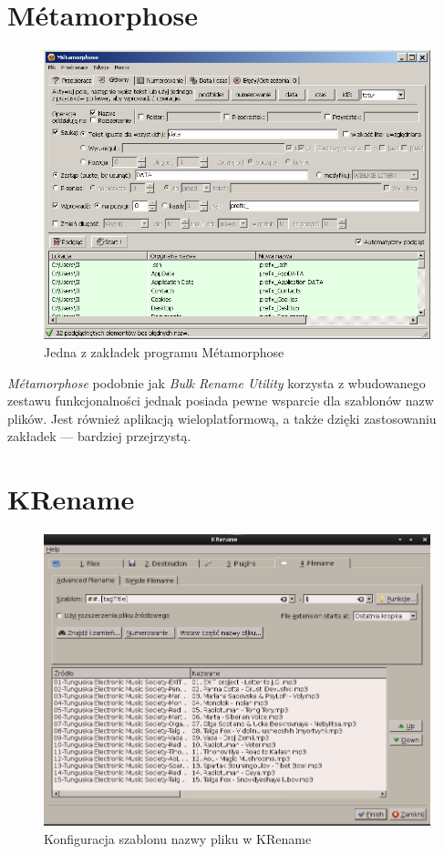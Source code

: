 \section{Métamorphose}
\begin{figure}[h]
\begin{center}
\includegraphics[scale=0.75]{img/metamorphose_window.png}
\end{center}
\caption{Jedna z zakładek programu Métamorphose}
\end{figure}

\par
\textit{Métamorphose} podobnie jak \textit{Bulk Rename Utility} korzysta z wbudowanego zestawu funkcjonalności jednak posiada pewne wsparcie dla szablonów nazw plików. Jest również aplikacją wieloplatformową, a także dzięki zastosowaniu zakładek --- bardziej przejrzystą.

\section{KRename}
\begin{figure}[h]
\begin{center}
\includegraphics[scale=0.55]{img/krename_window.png}
\end{center}
\caption{Konfiguracja szablonu nazwy pliku w KRename}
\end{figure}

